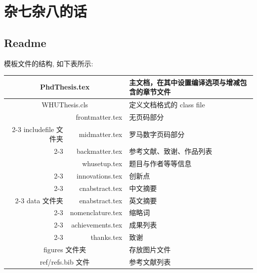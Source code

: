\chapter{杂七杂八的话}

\section{Readme}

模板文件的结构, 如下表所示:
 \begin{table}[ht]\centering
\begin{tabular}{r|r|l}
\hline\hline
  \multicolumn{2}{c|}{PhdThesis.tex }  &  主文档，在其中设置编译选项与增减包含的章节文件\\\hline
  \multicolumn{2}{c|}{WHUThesis.cls} &  定义文档格式的 class file\\\hline
                          &frontmatter.tex&  无页码部分 \\\cline{2-3}
  includefile 文件夹  & midmatter.tex  &  罗马数字页码部分  \\\cline{2-3}
                            & backmatter.tex &  参考文献、致谢、作品列表  \\\hline
                            &whusetup.tex&  题目与作者等等信息 \\\cline{2-3}
                            &innovations.tex&  创新点 \\\cline{2-3}
                            &cnabstract.tex&  中文摘要 \\\cline{2-3}
  data 文件夹  & enabstract.tex  &  英文摘要  \\\cline{2-3}
  &nomenclature.tex&  缩略词 \\\cline{2-3}
  &achievements.tex&  成果列表 \\\cline{2-3}
                            & thanks.tex &  致谢  \\\hline
  \multicolumn{2}{c|}{figures 文件夹} &  存放图片文件\\\hline
  \multicolumn{2}{c|}{ref/refs.bib 文件} &   参考文献列表\\
\hline\hline
\end{tabular}
\end{table}


